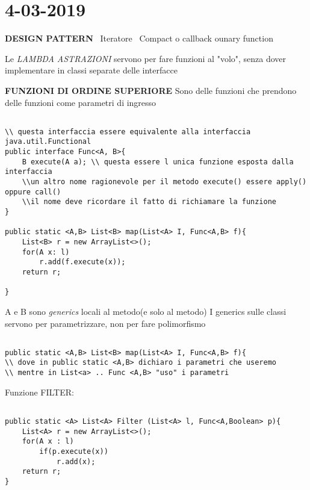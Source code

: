 

\newpage
\section{4-03-2019}
\textbf{DESIGN PATTERN} \newline
\textbullet\ Iteratore \newline
\textbullet\ Compact o callback ounary function 

\noindent Le \textit{LAMBDA ASTRAZIONI} servono per fare funzioni al "volo", senza dover implementare in classi separate delle interfacce	

\noindent \textbf{FUNZIONI DI ORDINE SUPERIORE} \newline
Sono delle funzioni che prendono delle funzioni come parametri di ingresso 
\begin{lstlisting}[basicstyle=\small,]

\\ questa interfaccia essere equivalente alla interfaccia java.util.Functional
public interface Func<A, B>{
	B execute(A a); \\ questa essere l unica funzione esposta dalla interfaccia
	\\un altro nome ragionevole per il metodo execute() essere apply() oppure call()
	\\il nome deve ricordare il fatto di richiamare la funzione 
}

public static <A,B> List<B> map(List<A> I, Func<A,B> f){
	List<B> r = new ArrayList<>();
	for(A x: l)
		r.add(f.execute(x));
	return r;

}

\end{lstlisting}
A e B sono \textit{generics} locali al metodo(e solo al metodo) \newline
I generics sulle classi servono per parametrizzare, non per fare polimorfismo \newline
\begin{lstlisting}[basicstyle=\small,]

public static <A,B> List<B> map(List<A> I, Func<A,B> f){
\\ dove in public static <A,B> dichiaro i parametri che useremo
\\ mentre in List<a> .. Func <A,B> "uso" i parametri

\end{lstlisting}

\noindent Funzione FILTER: 
\begin{lstlisting}[basicstyle=\small,]

public static <A> List<A> Filter (List<A> l, Func<A,Boolean> p){
	List<A> r = new ArrayList<>();
	for(A x : l)
		if(p.execute(x))
			r.add(x);
	return r;
}

\end{lstlisting}


